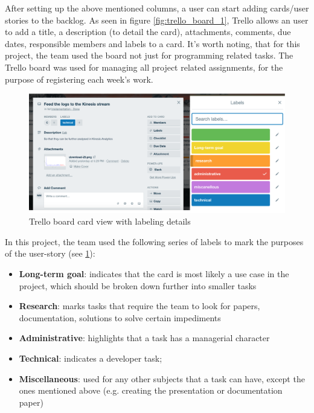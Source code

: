 After setting up the above mentioned columns, a user can start adding cards/user stories to the backlog. As seen in figure \ref{fig:trello_board_1}, Trello allows an user to add a title, a description (to detail the card), attachments, comments, due dates, responsible members and labels to a card.
It's worth noting, that for this project, the team used the board not just for programming related tasks. The Trello board was used for managing all project related assignments, for the purpose of registering each week's work.
\begin{figure}
    \centering
    \includegraphics[width=1\textwidth]{images/card-view.png}
    \caption{Trello board card view with labeling details }
    \label{fig:trello_board_2}
\end{figure}
In this project, the team used the following series of labels to mark the purposes of the user-story (see \ref{fig:trello_board_2}):
    \begin{itemize}
    \item \textbf{Long-term goal}: indicates that the card is most likely a use case in the project, which should be broken down further into smaller tasks
    \item \textbf{Research}: marks tasks that require the team to look for papers, documentation, solutions to solve certain impediments
    \item \textbf{Administrative}: highlights that a task has a managerial character
    \item \textbf{Technical}: indicates a developer task;
    \item \textbf{Miscellaneous}: used for any other subjects that a task can have, except the ones mentioned above (e.g. creating the presentation or documentation paper)
\end{itemize}
    